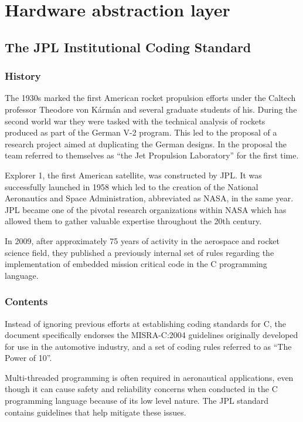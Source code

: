 \section{Hardware abstraction layer}
\author{Philip Trauner}

\subsection{The JPL Institutional Coding Standard}
\subsubsection{History}
The 1930s marked the first American rocket propulsion efforts under the Caltech professor Theodore von Kármán and several graduate students of his. During the second world war they were tasked with the technical analysis of rockets produced as part of the German V-2 program. This led to the proposal of a research project aimed at duplicating the German designs. In the proposal the team referred to themselves as “the Jet Propulsion Laboratory” for the first time.

Explorer 1, the first American satellite, was constructed by JPL. It was successfully launched in 1958 which led to the creation of the National Aeronautics and Space Administration, abbreviated as NASA, in the same year. JPL became one of the pivotal research organizations within NASA which has allowed them to gather valuable expertise throughout the 20th century. 

In 2009, after approximately 75 years of activity in the aerospace and rocket science field, they published a previously internal set of rules regarding the implementation of embedded mission critical code in the C programming language. 

\subsubsection{Contents}
Instead of ignoring previous efforts at establishing coding standards for C, the document specifically endorses the MISRA-C:2004 guidelines originally developed for use in the automotive industry, and a set of coding rules referred to as “The Power of 10”. 

Multi-threaded programming is often required in aeronautical applications, even though it can cause safety and reliability concerns when conducted in the C programming language because of its low level nature. The JPL standard contains guidelines that help mitigate these issues.

